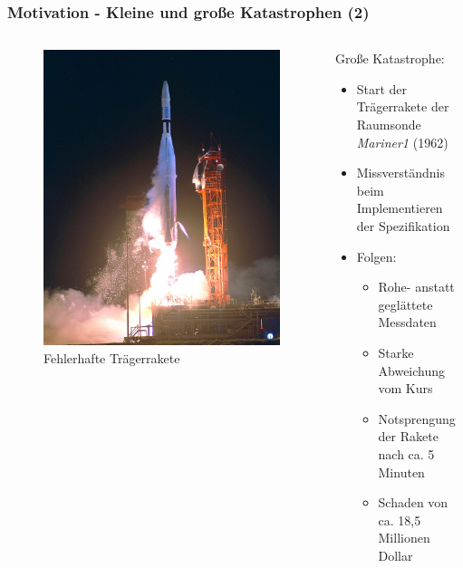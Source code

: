 %
%
\begin{frame}
	\frametitle{Motivation -  Kleine und große Katastrophen (2)}
	\begin{columns}
		\begin{column}{0.48\textwidth}
			\begin{figure}
				\includegraphics[scale=0.6]{grafiken/mariner}		
				\caption{Fehlerhafte Trägerrakete
					\footnotemark		
				}		
			\end{figure}
		\end{column}
		\begin{column}{0.48\textwidth}
			Große Katastrophe:
			\begin{itemize}
				\item Start der Trägerrakete der Raumsonde \emph{Mariner1} (1962)
				\pause
				\item Missverständnis beim Implementieren der Spezifikation
				\pause
				\item Folgen:
				\begin{itemize}
					\item Rohe- anstatt geglättete Messdaten
					\item Starke Abweichung vom Kurs
					\item Notsprengung der Rakete nach ca. 5 Minuten
					\item Schaden von ca. 18,5 Millionen Dollar
				\end{itemize}
			\end{itemize}
		\end{column}
		
	\end{columns}
\end{frame}
